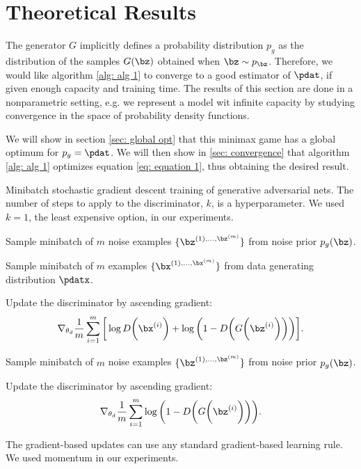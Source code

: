 \section{Theoretical Results}

The generator $G$ implicitly defines a probability distribution $p_g$ as the distribution of the samples $G(\bz)$ obtained when $\bz\sim p_{\bz}$. Therefore, we would like algorithm \ref{alg: alg 1} to converge to a good estimator of  $\pdat$, if given enough capacity and training time. The results of this section are done in a nonparametric setting, e.g. we represent a model wit infinite capacity by studying convergence in the space of probability density functions.

\noindent We will show in section \ref{sec: global opt} that this minimax game has a global optimum for $p_g = \pdat$. We will then show in \ref{sec: convergence} that algorithm \ref{alg: alg 1} optimizes equation \ref{eq: equation 1}, thus obtaining the desired result.

\begin{algorithm}
    \caption{Minibatch stochastic gradient descent training of generative adversarial nets. The number of steps to apply to the discriminator, $k$, is a hyperparameter. We used $k = 1$, the least expensive option, in our experiments.}
    \label{alg: alg 1}
    \begin{algorithmic}

            \textbullet \parbox[t]{0.9\linewidth}{Sample minibatch of $m$ noise examples $\{\bz^{(1), \dots, \bz^{(m)}}\}$ from noise prior $p_g(\bz)$.}

			\textbullet \parbox[t]{0.9\linewidth}{Sample minibatch of $m$ examples $\{\bx^{(1), \dots, \bx^{(m)}}\}$ from data generating distribution $\pdatx$.}

			\textbullet Update the discriminator by ascending gradient:
			\begin{equation*}
				\nabla_{\theta_d}\frac{1}{m}\sum^m_{i=1}{\bigg[\log D\bigg(\bx^{(i)}\bigg)+\log\bigg(1-D\bigg(G\bigg(\bz^{(i)}\bigg)\bigg)\bigg)\bigg]}.
			\end{equation*}
        \EndFor

		\textbullet \parbox[t]{0.9\linewidth}{Sample minibatch of $m$ noise examples $\{\bz^{(1), \dots, \bz^{(m)}}\}$ from noise prior $p_g(\bz)$.}

		\textbullet Update the discriminator by ascending gradient:
			\begin{equation*}
				\nabla_{\theta_d}\frac{1}{m}\sum^m_{i=1}{\log\bigg(1-D\bigg(G\bigg(\bz^{(i)}\bigg)\bigg)\bigg)}.
			\end{equation*}
		\EndFor

		\noindent\parbox[t]{0.9\linewidth}{The gradient-based updates can use any standard gradient-based learning rule. We used momentum in our experiments.}
    \end{algorithmic}
\end{algorithm}

